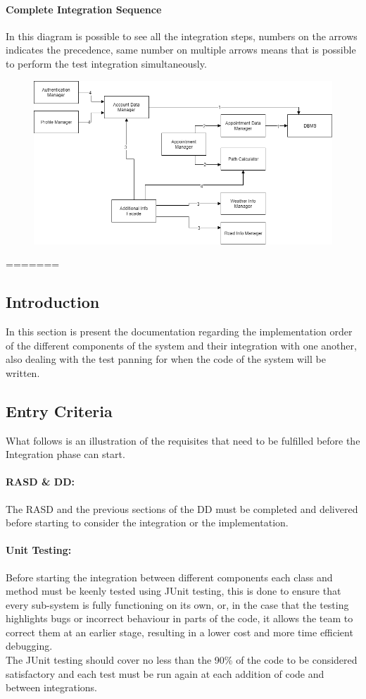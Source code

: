 \paragraph*{Complete Integration Sequence}
In this diagram is possible to see all the integration steps, numbers on the arrows indicates the precedence, same number on multiple arrows means that is possible to perform the test integration simultaneously.

\begin{figure}[h]
	\centering
	\includegraphics[width=\textwidth, keepaspectratio=true]{Img/IntegrationSequence}
\end{figure}
=======
\subsection{Introduction}
In this section is present the documentation regarding the implementation order of the different components of the system and their integration with one another, also dealing with the test panning for when the code of the system will be written.
\subsection{Entry Criteria}
What follows is an illustration of the requisites that need to be fulfilled before the Integration phase can start.
\paragraph*{RASD \& DD:\\} The RASD and the previous sections of the DD must be completed and delivered before starting to consider the integration or the implementation.
\paragraph*{Unit Testing:\\} Before starting the integration between different components each class and method must be keenly tested using JUnit testing, this is done to ensure that every sub-system is fully functioning on its own, or, in the case that the testing highlights bugs or incorrect behaviour in parts of the code, it allows the team to correct them at an earlier stage, resulting in a lower cost and more time efficient debugging.\\
The JUnit testing should cover no less than the 90\% of the code to be considered satisfactory and each test must be run again at each addition of code and between integrations.
